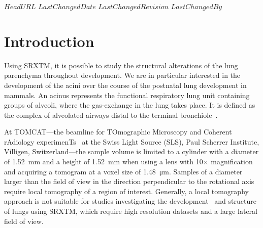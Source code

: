 \svnidlong
{$HeadURL$}
{$LastChangedDate$}
{$LastChangedRevision$}
{$LastChangedBy$}
%
%
\section{Introduction}


Using SRXTM, it is possible to study the structural alterations of the lung parenchyma throughout development. We are in particular interested in the development of the acini over the course of the postnatal lung development in mammals. An acinus represents the functional respiratory lung unit containing groups of alveoli, where the gas-exchange in the lung takes place. It is defined as the complex of alveolated airways distal to the terminal bronchiole~\cite{Rodriguez1987}.

At TOMCAT---the beamline for TOmographic Microscopy and Coherent rAdiology experimenTs~\cite{Stampanoni2007} at the Swiss Light Source (SLS), Paul Scherrer Institute, Villigen, Switzerland---the sample volume is limited to a cylinder with a diameter of \SI{1.52}{\milli\meter} and a height of \SI{1.52}{\milli\meter} when using a lens with 10$\times$ magnification and acquiring a tomogram at a voxel size of \SI{1.48}{\micro\meter}. Samples of a diameter larger than the field of view in the direction perpendicular to the rotational axis require local tomography of a region of interest. Generally, a local tomography approach is not suitable for studies investigating the development~\cite{Schittny2008,Mund2008} and structure~\cite{Tsuda2008} of lungs using SRXTM, which require high resolution datasets and a large lateral field of view.

